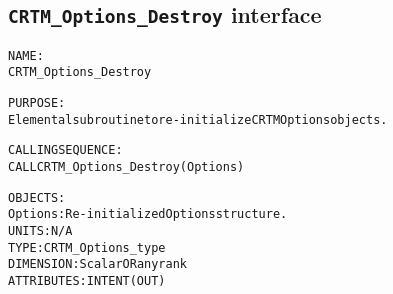 \subsection{\texttt{CRTM\_Options\_Destroy} interface}
  \label{sec:CRTM_Options_Destroy_interface}
  \begin{alltt}
 
  NAME:
        CRTM_Options_Destroy
 
  PURPOSE:
        Elemental subroutine to re-initialize CRTM Options objects.
 
  CALLING SEQUENCE:
        CALL CRTM_Options_Destroy( Options )
 
  OBJECTS:
        Options:      Re-initialized Options structure.
                      UNITS:      N/A
                      TYPE:       CRTM_Options_type
                      DIMENSION:  Scalar OR any rank
                      ATTRIBUTES: INTENT(OUT)
 
  \end{alltt}
